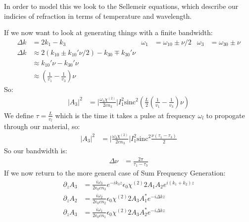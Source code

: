 In order to model this we look to the Sellemeir equations, which describe our indicies of refraction in terms of temperature and wavelength.

If we now want to look at generating things with a finite bandwidth:
\begin{align*}
	\Delta k &= 2k_1 -k_3 & \omega_1 &= \omega_{10} \pm \nu/2 & \omega_3 &= \omega_{30} \pm \nu \\
	\Delta k &\approx 2(k_{10} \pm k_{10}' \nu/2) - k_{30} \mp k_{30}'\nu \\
	&\approx k_{10}' \nu - k_{30}'\nu \\
	&\approx \left(\frac{1}{v_1} - \frac{1}{v_3}\right)\nu
\end{align*}
So:
\begin{align*}
	|A_3|^2 &= \Big|\frac{\omega_3\chi^{(2)}}{2cn_3}\Big| I_1^2 \text{sinc}^2\left(\frac{L}{2}\left(\frac{1}{v_1} - \frac{1}{v_3}\right)\nu\right)
\end{align*}
We define $\tau = \frac{L}{v_l}$ which is the time it takes a pulse at frequency $\omega_l$ to propogate through our material, so:
\begin{align*}
	|A_3|^2 &= \Big|\frac{\omega_3\chi^{(2)}}{2cn_3}\Big| I_1^2 \text{sinc}^2\frac{\nu (\tau_1-\tau_3)}{2}
\end{align*}
So our bandwidth is:
\begin{align*}
	\Delta\nu &= \frac{2\pi}{\tau_1-\tau_3}
\end{align*}
If we now return to the more general case of Sum Frequency Generation:
\begin{align*}
	\partial_z A_3 &= \frac{i\omega_3}{2\epsilon_0 cn_3} e^{-ik_3 z} \epsilon_0 \chi^{(2)} 2 A_1 A_2 e^{i(k_1 + k_2)z} \\
	\partial_z A_2 &= \frac{i\omega_2}{2\epsilon_0 cn_2} \epsilon_0 \chi^{(2)} 2 A_3 A_1^* e^{-i\Delta k z} \\
	\partial_z A_3 &= \frac{i\omega_1}{2\epsilon_0 cn_1} \epsilon_0 \chi^{(2)} 2 A_3 A_2^* e^{-i\Delta k z}
\end{align*}
